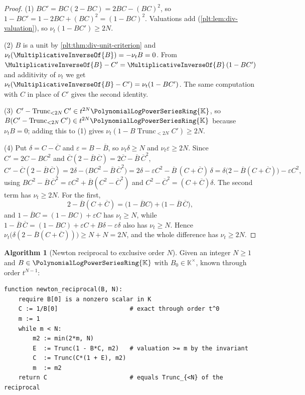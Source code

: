 \documentclass[11pt,oneside]{article}
\theoremstyle{plain}
\theoremstyle{definition}
\newtheorem{algorithm}[theorem]{Algorithm}
\theoremstyle{remark}
\newcommand{\K}{\mathbb{K}}
\newcommand{\PLpow}{\PolynomialLogPowerSeriesRing{\K}}   %
\newcommand{\ordt}{\nu_{t}}                              %
\newcommand{\Trunc}[2]{\operatorname{Trunc}_{<#2}#1}     %
\newcommand{\recip}[1]{\MultiplicativeInverseOf{#1}}
\begin{document}
\begin{proof}
(1)  \(BC'=BC(2-BC)=2BC-(BC)^{2}\), so
\(1-BC'=1-2BC+(BC)^{2}=(1-BC)^{2}\).  Valuations add
(\cref{plt:lem:div-valuation}), so \(\ordt(1-BC')\ge2N\).

(2)  \(B\) is a unit by \cref{plt:thm:div-unit-criterion} and
\(\ordt(\recip{B})=-\ordt B=0\).  From
\(\recip{B}-C'=\recip{B}\,(1-BC')\) and additivity of \(\ordt\) we get
\(\ordt(\recip{B}-C')=\ordt(1-BC')\).  The same computation with \(C\) in
place of \(C'\) gives the second identity.

(3)  \(C'-\Trunc{C'}{2N}\in t^{2N}\PLpow\), so
\(B(C'-\Trunc{C'}{2N})\in t^{2N}\PLpow\) because \(\ordt B=0\); adding this to
(1) gives \(\ordt(1-B\Trunc{C'}{2N})\ge2N\).

(4)  Put \(\delta=C-\overline C\) and \(\varepsilon=B-\overline B\), so
\(\ordt\delta\ge N\) and \(\ordt\varepsilon\ge2N\).  Since
\(C'=2C-BC^{2}\) and \(\overline C(2-\overline B\,\overline C)
=2\overline C-\overline B\,\overline C^{2}\),
\[
  C'-\overline C(2-\overline B\,\overline C)
  =2\delta-\bigl(BC^{2}-\overline B\,\overline C^{2}\bigr)
  =2\delta-\varepsilon C^{2}
    -\overline B\,(C+\overline C)\,\delta
  =\delta\bigl(2-\overline B(C+\overline C)\bigr)-\varepsilon C^{2},
\]
using \(BC^{2}-\overline B\,\overline C^{2}
=\varepsilon C^{2}+\overline B(C^{2}-\overline C^{2})\) and
\(C^{2}-\overline C^{2}=(C+\overline C)\delta\).  The second term has
\(\ordt\ge2N\).  For the first,
\[
  2-\overline B(C+\overline C)
  =\bigl(1-\overline BC\bigr)+\bigl(1-\overline B\,\overline C\bigr),
\]
and \(1-\overline BC=(1-BC)+\varepsilon C\) has \(\ordt\ge N\), while
\(1-\overline B\,\overline C=(1-BC)+\varepsilon C+B\delta-\varepsilon\delta\)
also has \(\ordt\ge N\).  Hence
\(\ordt\bigl(\delta(2-\overline B(C+\overline C))\bigr)\ge N+N=2N\), and the
whole difference has \(\ordt\ge2N\).
\end{proof}

\begin{algorithm}[Newton reciprocal to exclusive order \(N\)]
\label{plt:alg:div-newton}
Given an integer \(N\ge1\) and \(B\in\PLpow\) with \(B_{0}\in\K^{\times}\),
known through order \(t^{N-1}\):
\begin{lstlisting}[style=pseudo]
function newton_reciprocal(B, N):
    require B[0] is a nonzero scalar in K
    C := 1/B[0]                    # exact through order t^0
    m := 1
    while m < N:
        m2 := min(2*m, N)
        E  := Trunc(1 - B*C, m2)   # valuation >= m by the invariant
        C  := Trunc(C*(1 + E), m2)
        m  := m2
    return C                       # equals Trunc_{<N} of the reciprocal
\end{lstlisting}
\end{algorithm}
\end{document}
